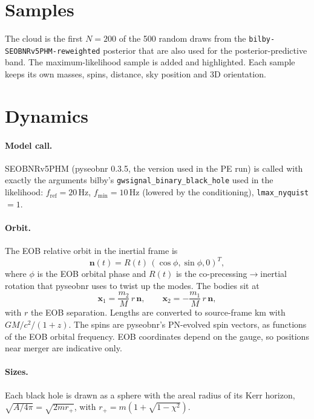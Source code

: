 \documentclass[11pt,a4paper]{article}
\newcommand{\code}[1]{\texttt{#1}}
\newcommand{\vect}[1]{\boldsymbol{#1}}
\begin{document}
\section{Samples}

The cloud is the first $N=200$ of the 500 random draws from the
\code{bilby-SEOBNRv5PHM-reweighted} posterior that are also used for the
posterior-predictive band. The maximum-likelihood sample is added and highlighted.
Each sample keeps its own masses, spins, distance, sky position and 3D orientation.

\section{Dynamics}\label{sec:dynamics}

\paragraph{Model call.} SEOBNRv5PHM (pyseobnr 0.3.5, the version used in the PE run) is
called with exactly the arguments bilby's \code{gwsignal\_binary\_black\_hole} used in the
likelihood: $f_\mathrm{ref}=20$\,Hz, $f_\mathrm{min}=10$\,Hz (lowered by the conditioning),
\code{lmax\_nyquist}$=1$.

\paragraph{Orbit.} The EOB relative orbit in the inertial frame is
\begin{equation}
  \vect{n}(t) = R(t)\,(\cos\phi, \sin\phi, 0)^T ,
\end{equation}
where $\phi$ is the EOB orbital phase and $R(t)$ is the co-precessing$\to$inertial rotation
that pyseobnr uses to twist up the modes. The bodies sit at
\begin{equation}
  \vect{x}_1 = \frac{m_2}{M}\, r\,\vect{n}, \qquad
  \vect{x}_2 = -\frac{m_1}{M}\, r\,\vect{n},
\end{equation}
with $r$ the EOB separation. Lengths are converted to source-frame km with
$G M/c^2/(1+z)$. The spins are pyseobnr's PN-evolved spin vectors, as functions of the EOB
orbital frequency. EOB coordinates depend on the gauge, so positions near merger are
indicative only.

\paragraph{Sizes.} Each black hole is drawn as a sphere with the areal radius of its
Kerr horizon, $\sqrt{A/4\pi} = \sqrt{2 m r_+}$, with $r_+ = m(1+\sqrt{1-\chi^2})$.
\end{document}
